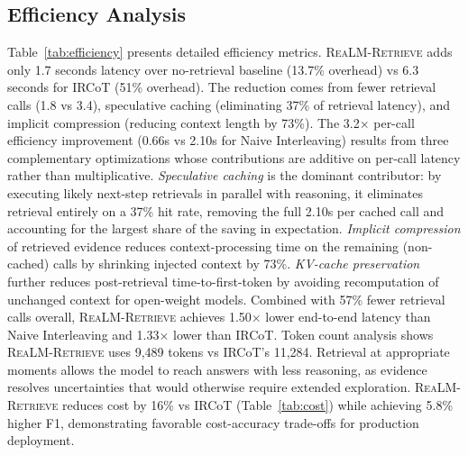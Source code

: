 \documentclass[sigconf,natbib=true]{acmart}
\newcommand{\methodname}{\textsc{ReaLM-Retrieve}}
\begin{document}
\subsection{Efficiency Analysis}
Table~\ref{tab:efficiency} presents detailed efficiency metrics. \methodname{} adds only 1.7 seconds latency over no-retrieval baseline (13.7\% overhead) vs 6.3 seconds for IRCoT (51\% overhead). The reduction comes from fewer retrieval calls (1.8 vs 3.4), speculative caching (eliminating 37\% of retrieval latency), and implicit compression (reducing context length by 73\%). The 3.2$\times$ per-call efficiency improvement (0.66s vs 2.10s for Naive Interleaving) results from three complementary optimizations whose contributions are additive on per-call latency rather than multiplicative. \emph{Speculative caching} is the dominant contributor: by executing likely next-step retrievals in parallel with reasoning, it eliminates retrieval entirely on a 37\% hit rate, removing the full 2.10s per cached call and accounting for the largest share of the saving in expectation. \emph{Implicit compression} of retrieved evidence reduces context-processing time on the remaining (non-cached) calls by shrinking injected context by 73\%. \emph{KV-cache preservation} further reduces post-retrieval time-to-first-token by avoiding recomputation of unchanged context for open-weight models. Combined with 57\% fewer retrieval calls overall, \methodname{} achieves 1.50$\times$ lower end-to-end latency than Naive Interleaving and 1.33$\times$ lower than IRCoT. Token count analysis shows \methodname{} uses 9,489 tokens vs IRCoT's 11,284. Retrieval at appropriate moments allows the model to reach answers with less reasoning, as evidence resolves uncertainties that would otherwise require extended exploration. \methodname{} reduces cost by 16\% vs IRCoT (Table~\ref{tab:cost}) while achieving 5.8\% higher F1, demonstrating favorable cost-accuracy trade-offs for production deployment.
\end{document}
